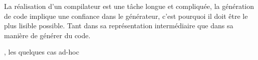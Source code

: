 La réalisation d'un compilateur est une tâche longue et compliquée, la génération de code implique une confiance dans le générateur, c'est pourquoi il doit être le plus lisible possible. Tant dans sa représentation intermédiaire que dans sa manière de générer du code.


, les quelques cas ad-hoc




























